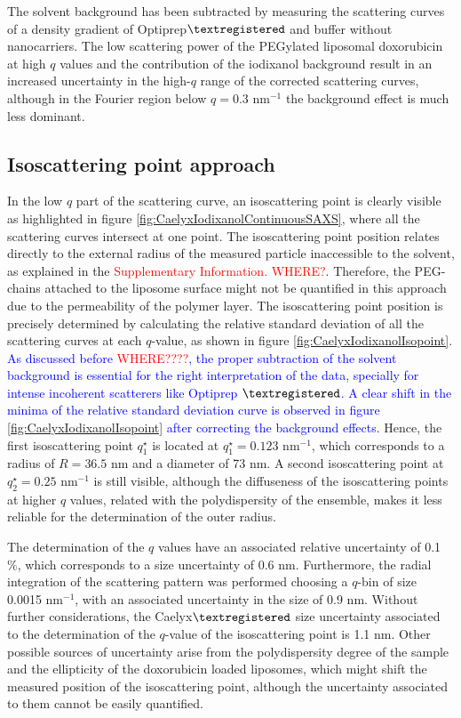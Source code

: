 The solvent background has been subtracted by measuring the scattering curves of a density gradient of Optiprep$\textregistered$ and buffer without nanocarriers. The low scattering power of the PEGylated liposomal doxorubicin at high $q$ values and the contribution of the iodixanol background result in an increased uncertainty in the high-$q$ range of the corrected scattering curves, although in the Fourier region below $q = 0.3$ nm$^{-1}$ the background effect is much less dominant.

\subsection{Isoscattering point approach}
In the low $q$ part of the scattering curve, an isoscattering point is clearly visible as highlighted in figure \ref{fig:CaelyxIodixanolContinuousSAXS}, where all the scattering curves intersect at one point. The isoscattering point position relates directly to the external radius of the measured particle inaccessible to the solvent, as explained in the \textcolor{red}{Supplementary Information.  WHERE?}. Therefore, the PEG-chains attached to the liposome surface might not be quantified in this approach due to the permeability of the polymer layer. The isoscattering point position is precisely determined by calculating the relative standard deviation of all the scattering curves at each $q$-value, as shown in figure \ref{fig:CaelyxIodixanolIsopoint}. \textcolor{blue}{As discussed before \textcolor{red}{WHERE????}, the proper subtraction of the solvent background is essential for the right interpretation of the data, specially for intense incoherent scatterers like Optiprep $\textregistered$. A clear shift in the minima of the relative standard deviation curve is observed in figure \ref{fig:CaelyxIodixanolIsopoint} after correcting the background effects.} Hence, the first isoscattering point $q^{\star}_1$ is located at $q^{\star}_1 = 0.123$ nm$^{-1}$, which corresponds to a radius of $R = 36.5$ nm and a diameter of 73 nm. A second isoscattering point at $q^{\star}_2 = 0.25$ nm$^{-1}$ is still visible, although the diffuseness of the isoscattering points at higher $q$ values, related with the polydispersity of the ensemble, makes it less reliable for the determination of the outer radius.

The determination of the $q$ values have an associated relative uncertainty of 0.1 $\%$, which corresponds to a size uncertainty of 0.6 nm. Furthermore, the radial integration of the scattering pattern was performed choosing a $q$-bin of size 0.0015 nm$^{-1}$, with an associated uncertainty in the size of 0.9 nm. Without further considerations, the Caelyx$\textregistered$ size uncertainty associated to the determination of the $q$-value of the isoscattering point is 1.1 nm. Other possible sources of uncertainty arise from the polydispersity degree of the sample and the ellipticity of the doxorubicin loaded liposomes, which might shift the measured position of the isoscattering point, although the uncertainty associated to them cannot be easily quantified. 

